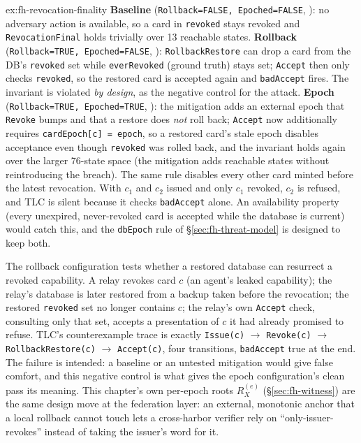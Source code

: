 \documentclass[11pt,a4paper]{article}
\theoremstyle{definition}
\theoremstyle{remark}
\begin{document}
\begin{pdsolution}{ex:fh-revocation-finality}
\textbf{Baseline} (\texttt{Rollback=FALSE, Epoched=FALSE}, ): no adversary action is available, so a card in \texttt{revoked} stays revoked and \texttt{RevocationFinal} holds trivially over 13 reachable states. \textbf{Rollback} (\texttt{Rollback=TRUE, Epoched=FALSE}, ): \texttt{RollbackRestore} can drop a card from the DB's \texttt{revoked} set while \texttt{everRevoked} (ground truth) stays set; \texttt{Accept} then only checks \texttt{revoked}, so the restored card is accepted again and \texttt{badAccept} fires. The invariant is violated \emph{by design}, as the negative control for the attack. \textbf{Epoch} (\texttt{Rollback=TRUE, Epoched=TRUE}, ): the mitigation adds an external epoch that \texttt{Revoke} bumps and that a restore does \emph{not} roll back; \texttt{Accept} now additionally requires \texttt{cardEpoch[c] = epoch}, so a restored card's stale epoch disables acceptance even though \texttt{revoked} was rolled back, and the invariant holds again over the larger 76-state space (the mitigation adds reachable states without reintroducing the breach). The same rule disables every other card minted before the latest revocation. With $c_1$ and $c_2$ issued and only $c_1$ revoked, $c_2$ is refused, and TLC is silent because it checks \texttt{badAccept} alone. An availability property (every unexpired, never-revoked card is accepted while the database is current) would catch this, and the \texttt{dbEpoch} rule of \S\ref{sec:fh-threat-model} is designed to keep both.

The rollback configuration tests whether a restored database can resurrect a revoked capability. A relay revokes card $c$ (an agent's leaked capability); the relay's database is later restored from a backup taken before the revocation; the restored \texttt{revoked} set no longer contains $c$; the relay's own \texttt{Accept} check, consulting only that set, accepts a presentation of $c$ it had already promised to refuse. TLC's counterexample trace is exactly \texttt{Issue(c)} $\to$ \texttt{Revoke(c)} $\to$ \texttt{RollbackRestore(c)} $\to$ \texttt{Accept(c)}, four transitions, \texttt{badAccept} true at the end. The failure is intended: a baseline or an untested mitigation would give false comfort, and this negative control is what gives the epoch configuration's clean pass its meaning. This chapter's own per-epoch roots $R_X^{(e)}$ (\S\ref{sec:fh-witness}) are the same design move at the federation layer: an external, monotonic anchor that a local rollback cannot touch lets a cross-harbor verifier rely on ``only-issuer-revokes'' instead of taking the issuer's word for it.
\end{pdsolution}
\end{document}
